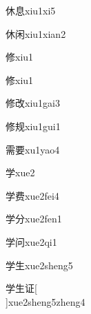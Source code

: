 \begin{verbete}[6;10]{休息}{xiu1xi5}
\end{verbete}

\begin{verbete}[6;7]{休闲}{xiu1xian2}
\end{verbete}

\begin{verbete}[9]{修}{xiu1}
\end{verbete}
\begin{verbete*}[9]{修}{xiu1}
\end{verbete*}

\begin{verbete}[9;7]{修改}{xiu1gai3}
\end{verbete}

\begin{verbete}[9;8]{修规}{xiu1gui1}
\end{verbete}

\begin{verbete}[14;9]{需要}{xu1yao4}
\end{verbete}

\begin{verbete}[8]{学}{xue2}
\end{verbete}

\begin{verbete}[8;9]{学费}{xue2fei4}
\end{verbete}

\begin{verbete}[8;4]{学分}{xue2fen1}
\end{verbete}

\begin{verbete}[8;12]{学问}{xue2qi1}
\end{verbete}

\begin{verbete}[8;5]{学生}{xue2sheng5}
\end{verbete}

\begin{verbete}[8;5;7]{学生证}[\\]{xue2sheng5zheng4}
\end{verbete}

